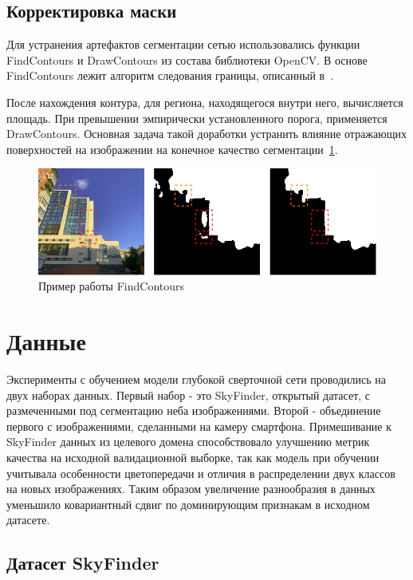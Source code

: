 \subsection{Корректировка маски}

Для устранения артефактов сегментации сетью использовались функции FindContours и DrawContours из состава библиотеки OpenCV\@.
В основе FindContours лежит алгоритм следования границы, описанный в~\autocite{Suzuki1985TopologicalSA}.

После нахождения контура, для региона, находящегося внутри него, вычисляется площадь.
При превышении эмпирически установленного порога, применяется DrawContours.
Основная задача такой доработки устранить влияние отражающих поверхностей на изображении на конечное качество сегментации~\ref{fig:find_contr}.

\begin{figure}[H]
    \centering
    \includegraphics[width=\textwidth]{img/find_contr.png}
    \caption{Пример работы FindContours}
    \label{fig:find_contr}
\end{figure}

\section{Данные}

Эксперименты с обучением модели глубокой сверточной сети проводились на двух наборах данных.
Первый набор - это SkyFinder, открытый датасет, с размеченными под сегментацию неба изображениями.
Второй - объединение первого с изображениями, сделанными на камеру смартфона.
Примешивание к SkyFinder данных из целевого домена способствовало улучшению метрик качества на исходной валидационной выборке, так как
модель при обучении учитывала особенности цветопередачи и отличия в распределении двух классов на новых изображениях.
Таким образом увеличение разнообразия в данных уменьшило ковариантный сдвиг по доминирующим признакам в исходном датасете.

\subsection{Датасет SkyFinder}


